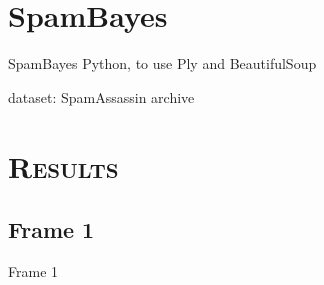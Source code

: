 \documentclass[xcolor=x11names,compress]{beamer}
\renewcommand{\(}{\begin{columns}}
\renewcommand{\)}{\end{columns}}
\newcommand{\<}[1]{\begin{column}{#1}}
\renewcommand{\>}{\end{column}}
\begin{document}
\section{SpamBayes}
\begin{frame}{SpamBayes}
  Python, to use Ply and BeautifulSoup
  
  dataset: SpamAssassin archive
\end{frame}

\section{\scshape Results}
\subsection{Frame 1}
\begin{frame}{Frame 1}

\end{frame}
\end{document}
